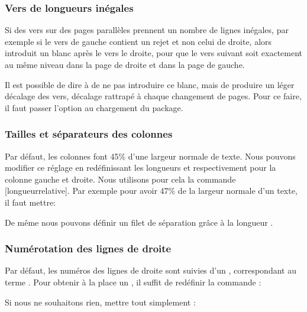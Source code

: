 \subsubsection{Vers de longueurs inégales}

Si des vers sur des pages parallèles prennent un nombre de lignes inégales, par exemple si le vers de gauche contient un rejet et non  celui de droite, alors  introduit un blanc après le vers le droite, pour que le vers suivant soit exactement au même niveau dans la page de droite et dans la page de gauche.

Il est possible de dire à  de ne pas introduire ce blanc, mais de produire un léger décalage des vers, décalage rattrapé à chaque changement de pages. Pour ce faire, il faut passer l'option  au chargement du package.

\begin{latexcode}
\usepackage[shiftedverses]{ledpar}
\end{latexcode}
 
 \subsubsection{Tailles et séparateurs des colonnes}

Par défaut, les colonnes font 45\% d'une largeur normale de texte. Nous pouvons modifier ce réglage en redéfinissant les longueurs  et  respectivement pour la colonne gauche et droite. Nous utilisons pour cela la commande [longueurrelative]. Par exemple pour avoir 47\% de la largeur normale d'un texte, il faut mettre:

\begin{latexcode}
\setlength{\Lcolwidth}{0.47\textwidth}
\setlength{\Rcolwidth}{0.47\textwidth}
\end{latexcode}

De même nous pouvons définir un filet de séparation grâce à la longueur .

\begin{latexcode}
\setlength{columnrulewidth}{0.4pt}
\end{latexcode}


\subsubsection{Numérotation des lignes de droite}

Par défaut, les numéros des lignes de droite sont suivies d'un , correspondant au terme . Pour obtenir à la place un , il suffit de redéfinir la commande  :

\begin{latexcode}
\renewcommand{\Rlineflag}{D}
\end{latexcode}

Si nous ne souhaitons  rien, mettre tout simplement :


\begin{latexcode}
\renewcommand{\Rlineflag}{}
\end{latexcode}




